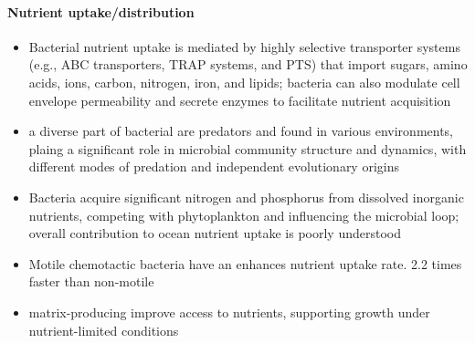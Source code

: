 \documentclass{article}
\begin{document}
\paragraph{Nutrient uptake/distribution}
\begin{itemize}
    \item \cite{Davies2021, Niederweis2008, Tanaka2018} Bacterial nutrient uptake is mediated by highly selective transporter systems (e.g., ABC transporters, TRAP systems, and PTS) that import sugars, amino acids, ions, carbon, nitrogen, iron, and lipids; bacteria can also modulate cell envelope permeability and secrete enzymes to facilitate nutrient acquisition
    \item \cite{Velicer2009}  \cite{Rory2015} a diverse part of bacterial are predators and found in various environments, plaing a significant role in microbial community structure and dynamics, with different modes of predation and independent evolutionary origins
    \item \cite{Caron1994} Bacteria acquire significant nitrogen and phosphorus from dissolved inorganic nutrients, competing with phytoplankton and influencing the microbial loop; overall contribution to ocean nutrient uptake is poorly understood
    \item \cite{Watteaux2015} Motile chemotactic bacteria have an enhances nutrient uptake rate. 2.2 times faster than non-motile 
    \item \cite{Li2025} matrix-producing improve access to nutrients, supporting growth under nutrient-limited conditions
\end{itemize}
\end{document}
